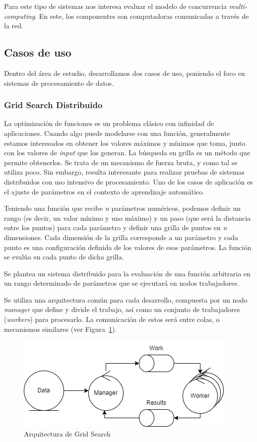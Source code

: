 \documentclass[11pt]{article}
\let\Oldsubsection\subsection
\renewcommand{\subsection}{\FloatBarrier\Oldsubsection}
\let\Oldsubsubsection\subsubsection
\renewcommand{\subsubsection}{\FloatBarrier\Oldsubsubsection}
\newcommand{\english}[1]{\textit{#1}}
\begin{document}
Para este tipo de sistemas nos interesa evaluar el modelo de concurrencia \english{multi-computing}. En este, los componentes son computadoras comunicadas a través de la red.

\newpage

\subsection{Casos de uso}

Dentro del área de estudio, desarrollamos dos casos de uso, poniendo el foco en sistemas de procesamiento de datos.

\subsubsection{Grid Search Distribuido}

La optimización de funciones es un problema clásico con infinidad de aplicaciones. Cuando algo puede modelarse con una función, generalmente estamos interesados en obtener los valores máximos y mínimos que toma, junto con los valores de \english{input} que los generan. La búsqueda en grilla es un método que permite obtenerlos. Se trata de un mecanismo de fuerza bruta, y como tal se utiliza poco. Sin embargo, resulta interesante para realizar pruebas de sistemas distribuidos con uso intensivo de procesamiento. Uno de los casos de aplicación es el ajuste de parámetros en el contexto de aprendizaje automático.

Teniendo una función que recibe \textit{n} parámetros numéricos, podemos definir un rango (es decir, un valor mínimo y uno máximo) y un paso (que será la distancia entre los puntos) para cada parámetro y definir una grilla de puntos en \textit{n} dimensiones.
Cada dimensión de la grilla corresponde a un parámetro y cada punto es una configuración definida de los valores de esos parámetros.
La función se evalúa en cada punto de dicha grilla.

Se plantea un sistema distribuido para la evaluación de una función arbitraria en un rango determinado de parámetros que se ejecutará en nodos trabajadores.

Se utiliza una arquitectura común para cada desarrollo, compuesta por un nodo \english{manager} que define y divide el trabajo, así como un conjunto de trabajadores (\english{workers}) para procesarlo. La comunicación de estos será entre colas, o mecanismos similares (ver Figura~\ref{fig:sis_dist:grid_search_arch}).

\begin{figure}[h]
    \centering
    \includegraphics[scale=0.5]{resources/distributed_systems/grid_search_arch.png}
    \caption{Arquitectura de Grid Search}
    \label{fig:sis_dist:grid_search_arch}
\end{figure}
\end{document}
